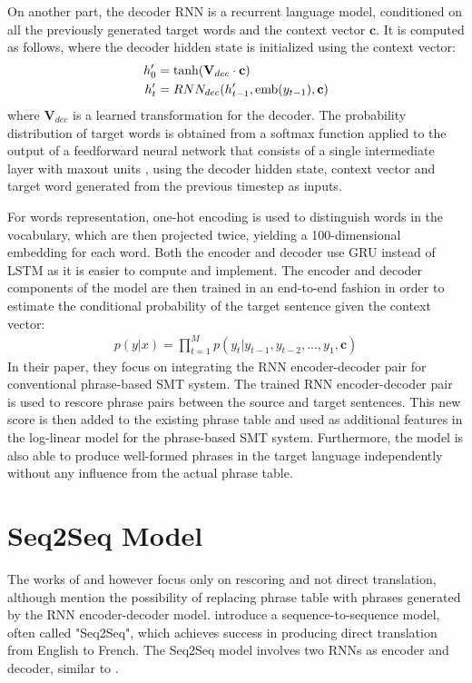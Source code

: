 \documentclass[12pt]{extarticle}
\begin{document}
On another part, the decoder RNN is a recurrent language model, conditioned on all the previously generated target words and the context vector $\textbf{c}$. It is computed as follows, where the decoder hidden state is initialized using the context vector:
\begin{align} 
h'_{0} &= \textnormal{tanh}(\textbf{V}_{dec} \cdot \textbf{c}) \\
h'_{t} &= RNN_{dec}(h'_{t-1}, \textnormal{emb}(y_{t-1}), \textbf{c}) 
\label{eq:18}
\end{align}
where $\textbf{V}_{dec}$ is a learned transformation for the decoder. The probability distribution of target words is obtained from a softmax function applied to the output of a feedforward neural network that consists of a single intermediate layer with maxout units \citep{Goodfellow:2013:MN:3042817.3043084}, using the decoder hidden state, context vector and target word generated from the previous timestep as inputs.

For words representation, one-hot encoding is used to distinguish words in the vocabulary, which are then projected twice, yielding a 100-dimensional embedding for each word.
Both the encoder and decoder use GRU instead of LSTM as it is easier to compute and implement. The encoder and decoder components of the model are then trained in an end-to-end fashion in order to estimate the conditional probability of the target sentence given the context vector: 
\begin{align}
p(y|x) = \prod_{t=1}^{M} p(y_{t} | y_{t-1}, y_{t-2},...,y_{1}, \textbf{c}) \label{eq:19}
\end{align}
In their paper, they focus on integrating the RNN encoder-decoder pair for conventional phrase-based SMT system. The trained RNN encoder-decoder pair is used to rescore phrase pairs between the source and target sentences. This new score is then added to the existing phrase table and used as additional features in the log-linear model for the phrase-based SMT system. Furthermore, the model is also able to produce well-formed phrases in the target language independently without any influence from the actual phrase table.


\section*{Seq2Seq Model}
The works of \citep{kalchbrenner-blunsom-2013-recurrent-continuous} and \citep{cho-etal-2014-learning} however focus only on rescoring and not direct translation, although \citep{cho-etal-2014-learning} mention the possibility of replacing phrase table with phrases generated by the RNN encoder-decoder model. \citep{Sutskever:2014:SSL:2969033.2969173} introduce a sequence-to-sequence model, often called "Seq2Seq", which achieves success in producing direct translation from English to French. The Seq2Seq model involves two RNNs as encoder and decoder, similar to \citep{cho-etal-2014-learning}.
\end{document}
